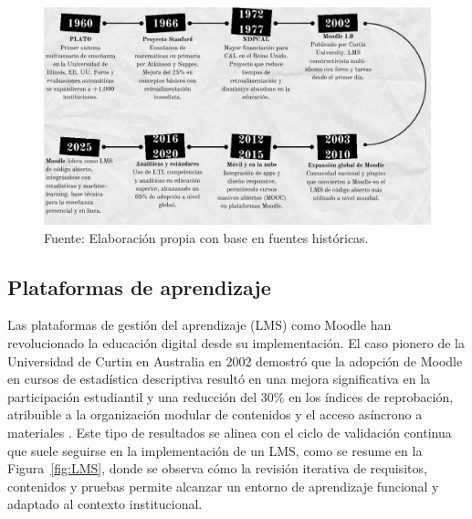 \documentclass[letter,oneside,12pt,spanish]{report}
\begin{document}
\begin{figure}[ht]
	\centering
	\includegraphics[width=1\textwidth]{Figs/Linea del Tiempo.pdf}
	\label{fig:LineaTiempo}
	\\Fuente: Elaboración propia con base en fuentes históricas.
\end{figure}

\subsection{Plataformas de aprendizaje}
Las plataformas de gestión del aprendizaje (LMS) como Moodle han revolucionado la educación digital desde su implementación. El caso pionero de la Universidad de Curtin en Australia en 2002 demostró que la adopción de Moodle en cursos de estadística descriptiva resultó en una mejora significativa en la participación estudiantil y una reducción del 30\% en los índices de reprobación, atribuible a la organización modular de contenidos y el acceso asíncrono a materiales \parencite{Pacheco2025}. Este tipo de resultados se alinea con el ciclo de validación continua que suele seguirse en la implementación de un LMS, como se resume en la Figura~\ref{fig:LMS}, donde se observa cómo la revisión iterativa de requisitos, contenidos y pruebas permite alcanzar un entorno de aprendizaje funcional y adaptado al contexto institucional.
\end{document}
